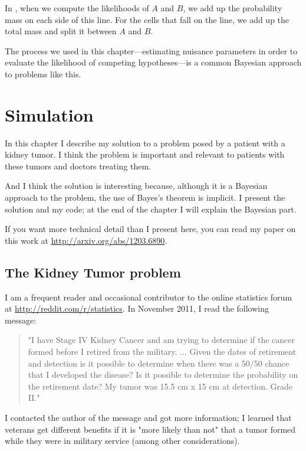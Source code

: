 \documentclass[12pt]{book}
\theoremstyle{exercise}
\begin{document}
In , when we compute the likelihoods of $A$ and
$B$, we add up the probability mass on each side of this line.  For the
cells that fall on the line, we add up the total mass and split it
between $A$ and $B$.

The process we used in this chapter---estimating nuisance
parameters in order to evaluate the likelihood of competing
hypotheses---is a common Bayesian approach to problems like this.




\chapter{Simulation}

In this chapter I describe my solution to a problem posed
by a patient with a kidney tumor.  I think the problem is 
important and relevant to patients with these tumors
and doctors treating them.

And I think the solution is interesting because, although it
is a Bayesian approach to the problem, the use of Bayes's theorem
is implicit.  I present the solution and my code; at the end
of the chapter I will explain the Bayesian part.

If you want more technical detail than I present here, you can
read my paper on this work at \url{http://arxiv.org/abs/1203.6890}.


\section{The Kidney Tumor problem}

I am a frequent reader and occasional contributor to the online statistics
forum at \url{http://reddit.com/r/statistics}.  In November 2011, I read
the following message:

\begin{quote}
"I have Stage IV Kidney Cancer and am trying to determine if the
  cancer formed before I retired from the military. ... Given the
  dates of retirement and detection is it possible to determine when
  there was a 50/50 chance that I developed the disease? Is it
  possible to determine the probability on the retirement date?  My
  tumor was 15.5 cm x 15 cm at detection. Grade II."
\end{quote}

I contacted the author of the message and got more information; I learned
that veterans get different benefits if it is "more likely than not"
that a tumor formed while they were in military service (among other
considerations).
\end{document}
